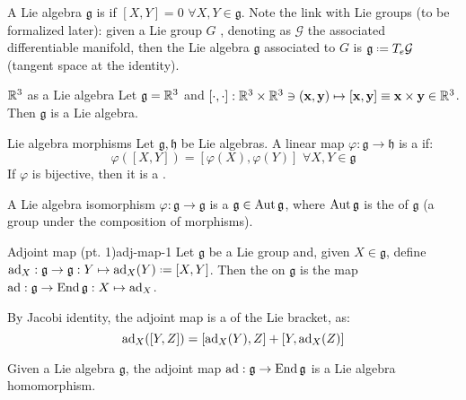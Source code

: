 A Lie algebra $ \mathfrak{g} $ is  if $ [X,Y] = 0 \,\,\forall X,Y \in \mathfrak{g} $. Note the link with Lie groups (to be formalized later): given a Lie group $ G $ , denoting as $ \mathcal{G} $ the associated differentiable manifold, then the Lie algebra $ \mathfrak{g} $ associated to $ G $ is $ \mathfrak{g} \defeq T_e\mathcal{G} $ (tangent space at the identity).

\begin{example}{$ \mathbb{R}^3 $ as a Lie algebra}{}
  Let $ \mathfrak{g} = \mathbb{R}^3 $ and $ [\cdot,\cdot] : \mathbb{R}^3 \times \mathbb{R}^3 \ni (\mathbf{x},\mathbf{y}) \mapsto [\mathbf{x} , \mathbf{y}] \equiv \mathbf{x} \times \mathbf{y} \in \mathbb{R}^3 $. Then $ \mathfrak{g} $ is a Lie algebra.
\end{example}

\begin{definition}{Lie algebra morphisms}{}
  Let $ \mathfrak{g} , \mathfrak{h} $ be Lie algebras. A linear map $ \varphi : \mathfrak{g} \rightarrow \mathfrak{h} $ is a  if:
  \begin{equation*}
    \varphi([X,Y]) = [\varphi(X),\varphi(Y)] \,\,\forall X,Y \in \mathfrak{g}
  \end{equation*}
  If $ \varphi $ is bijective, then it is a .
\end{definition}

A Lie algebra isomorphism $ \varphi : \mathfrak{g} \rightarrow \mathfrak{g} $ is a  $ \mathfrak{g} \in \operatorname{Aut}{\mathfrak{g}} $, where $ \operatorname{Aut}{\mathfrak{g}} $ is the  of $ \mathfrak{g} $ (a group under the composition of morphisms).

\begin{definition}{Adjoint map (pt. 1)}{adj-map-1}
  Let $ \mathfrak{g} $ be a Lie group and, given $ X \in \mathfrak{g} $, define $ \ad_X : \mathfrak{g} \rightarrow \mathfrak{g} : Y \mapsto \ad_X(Y) \defeq [X,Y] $. Then the  on $ \mathfrak{g} $ is the map $ \operatorname{ad} : \mathfrak{g} \rightarrow \operatorname{End}{\mathfrak{g}} : X \mapsto \operatorname{ad}_X $.
\end{definition}

By Jacobi identity, the adjoint map is a  of the Lie bracket, as:
\begin{equation*}
  \operatorname{ad}_X([Y,Z]) = [\operatorname{ad}_X(Y),Z] + [Y,\operatorname{ad}_X(Z)]
\end{equation*}

\begin{proposition}{}{}
  Given a Lie algebra $ \mathfrak{g} $, the adjoint map $ \operatorname{ad} : \mathfrak{g} \rightarrow \operatorname{End}{\mathfrak{g}} $ is a Lie algebra homomorphism.
\end{proposition}

